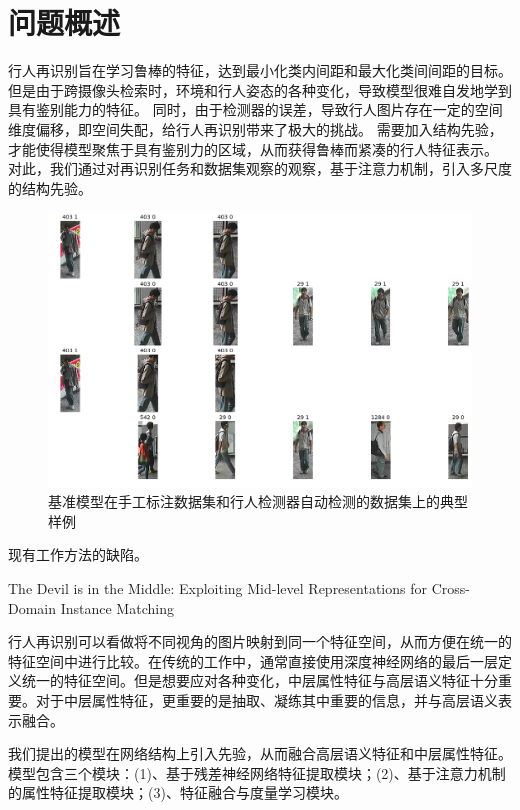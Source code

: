\section{问题概述}

行人再识别旨在学习鲁棒的特征，达到最小化类内间距和最大化类间间距的目标。
但是由于跨摄像头检索时，环境和行人姿态的各种变化，导致模型很难自发地学到具有鉴别能力的特征。
同时，由于检测器的误差，导致行人图片存在一定的空间维度偏移，即空间失配，给行人再识别带来了极大的挑战。
需要加入结构先验，才能使得模型聚焦于具有鉴别力的区域，从而获得鲁棒而紧凑的行人特征表示。 
对此，我们通过对再识别任务和数据集观察的观察，基于注意力机制，引入多尺度的结构先验。

\begin{figure}[htbp]
    \centering 
    \includegraphics[width=.95\textwidth]{fig/2018-04-18-21-53-15.png}
    \caption{基准模型在手工标注数据集和行人检测器自动检测的数据集上的典型样例} \label{fig:label2det}
\end{figure}

现有工作方法的缺陷。

\misscite The Devil is in the Middle: Exploiting Mid-level Representations for Cross-Domain Instance Matching 

行人再识别可以看做将不同视角的图片映射到同一个特征空间，从而方便在统一的特征空间中进行比较。在传统的工作中，通常直接使用深度神经网络的最后一层定义统一的特征空间。但是想要应对各种变化，中层属性特征与高层语义特征十分重要。对于中层属性特征，更重要的是抽取、凝练其中重要的信息，并与高层语义表示融合。

我们提出的模型在网络结构上引入先验，从而融合高层语义特征和中层属性特征。模型包含三个模块：(1)、基于残差神经网络特征提取模块；(2)、基于注意力机制的属性特征提取模块；(3)、特征融合与度量学习模块。

